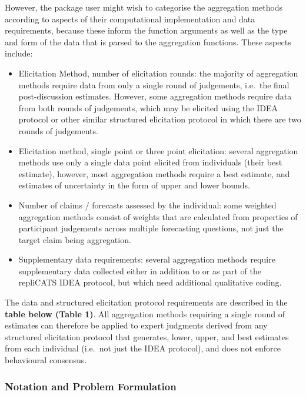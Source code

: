 \documentclass[article]{jss}
\providecommand{\tightlist}{%
  \setlength{\itemsep}{0pt}\setlength{\parskip}{0pt}}\usepackage{longtable,booktabs,array}
\begin{document}
However, the  package user might wish to categorise the
aggregation methods according to aspects of their computational
implementation and data requirements, because these inform the function
arguments as well as the type and form of the data that is parsed to the
aggregation functions. These aspects include:

\begin{itemize}
\tightlist
\item
  Elicitation Method, number of elicitation rounds: the majority of
  aggregation methods require data from only a single round of
  judgements, i.e.~the final post-discussion estimates. However, some
  aggregation methods require data from both rounds of judgements, which
  may be elicited using the IDEA protocol or other similar structured
  elicitation protocol in which there are two rounds of judgements.
\item
  Elicitation method, single point or three point elicitation: several
  aggregation methods use only a single data point elicited from
  individuals (their best estimate), however, most aggregation methods
  require a best estimate, and estimates of uncertainty in the form of
  upper and lower bounds.
\item
  Number of claims / forecasts assessed by the individual: some weighted
  aggregation methods consist of weights that are calculated from
  properties of participant judgements across multiple forecasting
  questions, not just the target claim being aggregation.
\item
  Supplementary data requirements: several aggregation methods require
  supplementary data collected either in addition to or as part of the
  repliCATS IDEA protocol, but which need additional qualitative coding.
\end{itemize}

The data and structured elicitation protocol requirements are described
in the \textbf{table below (Table 1)}. All aggregation methods requiring
a single round of estimates can therefore be applied to expert judgments
derived from any structured elicitation protocol that generates, lower,
upper, and best estimates from each individual (i.e.~not just the IDEA
protocol), and does not enforce behavioural consensus.

\hypertarget{notation-and-problem-formulation}{%
\subsubsection{Notation and Problem
Formulation}\label{notation-and-problem-formulation}}
\end{document}

